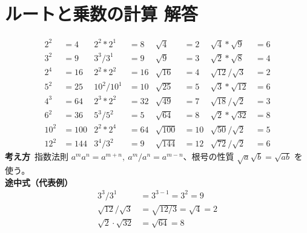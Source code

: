 \documentclass[paper=b4j,landscape,twocolumn,fleqn]{jlreq}
\begin{document}
\section{ルートと乗数の計算 解答}
\begin{align*}
2^2&=4 & 2^2*2^1&=8 & \sqrt{4}&=2 & \sqrt{4}*\sqrt{9}&=6\\
3^2&=9 & 3^3/3^1&=9 & \sqrt{9}&=3 & \sqrt{2}*\sqrt{8}&=4\\
2^4&=16 & 2^2*2^2&=16 & \sqrt{16}&=4 & \sqrt{12}/\sqrt{3}&=2\\
5^2&=25 & 10^2/10^1&=10 & \sqrt{25}&=5 & \sqrt{3}*\sqrt{12}&=6\\
4^3&=64 & 2^3*2^2&=32 & \sqrt{49}&=7 & \sqrt{18}/\sqrt{2}&=3\\
6^2&=36 & 5^3/5^2&=5 & \sqrt{64}&=8 & \sqrt{2}*\sqrt{32}&=8\\
10^2&=100 & 2^2*2^4&=64 & \sqrt{100}&=10 & \sqrt{50}/\sqrt{2}&=5\\
12^2&=144 & 3^4/3^2&=9 & \sqrt{144}&=12 & \sqrt{72}/\sqrt{2}&=6
\end{align*}
\textbf{考え方}\
指数法則 $a^m a^n=a^{m+n},\ a^m/a^n=a^{m-n}$、根号の性質 $\sqrt{a}\sqrt{b}=\sqrt{ab}$ を使う。\\
\textbf{途中式（代表例）}
\begin{align*}
3^3/3^1&=3^{3-1}=3^2=9\\
\sqrt{12}/\sqrt{3}&=\sqrt{12/3}=\sqrt4=2\\
\sqrt2\cdot\sqrt{32}&=\sqrt{64}=8
\end{align*}

\newpage
\end{document}
